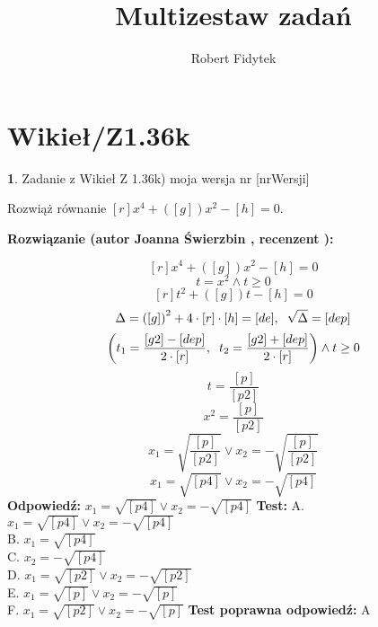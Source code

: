 \documentclass[12pt, a4paper]{article}
\title{Multizestaw zadań}
\author{Robert Fidytek}
\date{}
\theoremstyle{definition} %
\newtheorem{zad}{}
\newcommand{\kategoria}[1]{\section{#1}} %
\newcommand{\zadStart}[1]{\begin{zad}#1\newline} %
\newcommand{\zadStop}{\end{zad}}   %
\newcommand{\rozwStart}[2]{\noindent \textbf{Rozwiązanie (autor #1 , recenzent #2): }\newline} %
\newcommand{\rozwStop}{\newline}                                            %
\newcommand{\odpStart}{\noindent \textbf{Odpowiedź:}\newline}    %
\newcommand{\odpStop}{\newline}                                             %
\newcommand{\testStart}{\noindent \textbf{Test:}\newline} %
\newcommand{\testStop}{\newline} %
\newcommand{\kluczStart}{\noindent \textbf{Test poprawna odpowiedź:}\newline} %
\newcommand{\kluczStop}{\newline} %
\begin{document}
\maketitle


\kategoria{Wikieł/Z1.36k}
\zadStart{Zadanie z Wikieł Z 1.36k) moja wersja nr [nrWersji]}


Rozwiąż równanie $[r] x^4 + ([g]) x^2- [h]=0$.
\zadStop
\rozwStart{Joanna Świerzbin}{}

$$[r] x^4 + ([g]) x^2- [h]=0$$
$$ t=x^2 \land t \geq 0 $$
$$[r]t^{2}+([g])t-[h]=0$$
$$\Delta= {([g])}^2 + 4\cdot[r]\cdot[h]= [de], \hspace{0.2 cm} \sqrt{\Delta}=[dep]$$
$$\left(t_1= \frac{[g2]-[dep]}{2\cdot[r]}, \hspace{0.2 cm} t_2=\frac{[g2]+[dep]}{2\cdot[r]}\right) \land t \geq 0 $$
$$  t=\frac{[p]}{[p2]}$$
$$ x^2=\frac{[p]}{[p2]}$$
$$ x_1=\sqrt{\frac{[p]}{[p2]}} \vee  x_2=-\sqrt{\frac{[p]}{[p2]}}$$
$$ x_1=\sqrt{[p4]} \vee  x_2=-\sqrt{[p4]}$$
\rozwStop
\odpStart
$ x_1=\sqrt{[p4]} \vee  x_2=-\sqrt{[p4]}$
\odpStop
\testStart
A. $x_1=\sqrt{[p4]} \vee  x_2=-\sqrt{[p4]}$\\
B. $x_1=\sqrt{[p4]} $\\
C. $x_2=-\sqrt{[p4]}$\\
D. $ x_1=\sqrt{[p2]} \vee  x_2=-\sqrt{[p2]}$\\
E. $ x_1=\sqrt{[p]} \vee  x_2=-\sqrt{[p]}$ \\
F. $ x_1=\sqrt{[p2]} \vee  x_2=-\sqrt{[p]}$
\testStop
\kluczStart
A
\kluczStop
\end{document}
